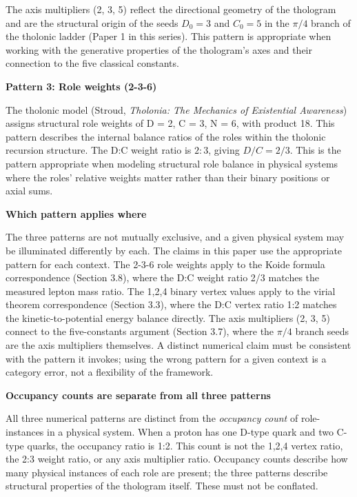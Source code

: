 \documentclass[
  11pt,
  letterpaper,
]{article}
\begin{document}
The axis multipliers (2, 3, 5) reflect the directional geometry of the
thologram and are the structural origin of the seeds \(D_0 = 3\) and
\(C_0 = 5\) in the \(\pi/4\) branch of the tholonic ladder (Paper 1 in
this series). This pattern is appropriate when working with the
generative properties of the thologram's axes and their connection to
the five classical constants.

\textbf{Pattern 3: Role weights (2-3-6)}

The tholonic model (Stroud, \emph{Tholonia: The Mechanics of Existential
Awareness}) assigns structural role weights of D = 2, C = 3, N = 6, with
product 18. This pattern describes the internal balance ratios of the
roles within the tholonic recursion structure. The D:C weight ratio is
\(2:3\), giving \(D/C = 2/3\). This is the pattern appropriate when
modeling structural role balance in physical systems where the roles'
relative weights matter rather than their binary positions or axial
sums.

\textbf{Which pattern applies where}

The three patterns are not mutually exclusive, and a given physical
system may be illuminated differently by each. The claims in this paper
use the appropriate pattern for each context. The 2-3-6 role weights
apply to the Koide formula correspondence (Section 3.8), where the D:C
weight ratio 2/3 matches the measured lepton mass ratio. The 1,2,4
binary vertex values apply to the virial theorem correspondence (Section
3.3), where the D:C vertex ratio 1:2 matches the kinetic-to-potential
energy balance directly. The axis multipliers (2, 3, 5) connect to the
five-constants argument (Section 3.7), where the \(\pi/4\) branch seeds
are the axis multipliers themselves. A distinct numerical claim must be
consistent with the pattern it invokes; using the wrong pattern for a
given context is a category error, not a flexibility of the framework.

\textbf{Occupancy counts are separate from all three patterns}

All three numerical patterns are distinct from the \emph{occupancy
count} of role-instances in a physical system. When a proton has one
D-type quark and two C-type quarks, the occupancy ratio is 1:2. This
count is not the 1,2,4 vertex ratio, the 2:3 weight ratio, or any axis
multiplier ratio. Occupancy counts describe how many physical instances
of each role are present; the three patterns describe structural
properties of the thologram itself. These must not be conflated.
\end{document}
